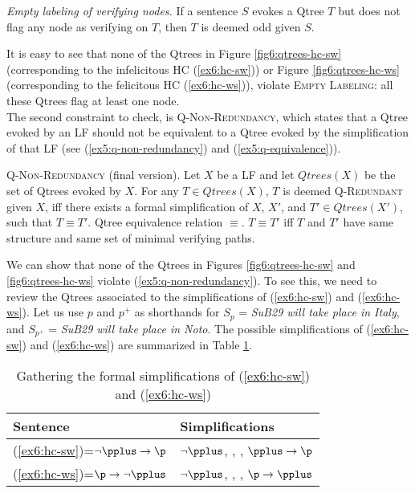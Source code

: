 \begin{exe}
	 {\textit{Empty labeling of verifying nodes.} If a sentence $S$ evokes a Qtree $T$ but does not flag any node as verifying on $T$, then $T$ is deemed odd given $S$.}
\end{exe}

It is easy to see that none of the Qtrees in Figure \ref{fig6:qtrees-hc-sw} (corresponding to the infelicitous HC (\ref{ex6:hc-sw})) or Figure \ref{fig6:qtrees-hc-ws} (corresponding to the felicitous HC (\ref{ex6:hc-ws})), violate \textsc{Empty Labeling}: all these Qtrees flag at least one node.\\


The second constraint to check, is \textsc{Q-Non-Redundancy}, which states that a Qtree evoked by an LF should not be equivalent to a Qtree evoked by the simplification of that LF (see (\ref{ex5:q-non-redundancy}) and (\ref{ex5:q-equivalence})).
\begin{exe}
	 {{\textsc{Q-Non-Redundancy} (final version)}. Let $X$ be a LF and let $Qtrees(X)$ be the set of Qtrees evoked by $X$. For any $T \in Qtrees(X)$, $T$ is deemed \textsc{Q-Redundant} given $X$, iff there exists a formal simplification of $X$, $X'$, and $T' \in Qtrees(X')$, such that $T\equiv T'$.}
	 {Qtree equivalence relation $\equiv$. $T \equiv T'$ iff $T$ and $T'$ have same structure and same set of minimal verifying paths.}
\end{exe}


We can show that none of the Qtrees in Figures \ref{fig6:qtrees-hc-sw} and \ref{fig6:qtrees-hc-ws} violate (\ref{ex5:q-non-redundancy}). To see this, we need to review the Qtrees associated to the simplifications of (\ref{ex6:hc-sw}) and (\ref{ex6:hc-ws}). Let us use $p$ and $p^+$ as shorthands for $S_p$ = \textit{SuB29 will take place in Italy}, and $S_{p^+}$ = \textit{SuB29 will take place in Noto}. The possible simplifications of (\ref{ex6:hc-sw}) and (\ref{ex6:hc-ws}) are summarized in Table \ref{tab6:hc-simplifications}.

\begin{table}[H]
	\centering
	\begin{tabular}{ll}
		\toprule
		Sentence & Simplifications                                             \\ \midrule
		(\ref{ex6:hc-sw})=$\neg\pplus\rightarrow\p$     & $\neg\pplus$, \pplus, \p, $\pplus\rightarrow\p$\\
		(\ref{ex6:hc-ws})=$\p\rightarrow\neg\pplus$     & $\neg\pplus$, \pplus, \p, $\p\rightarrow\pplus$\\\bottomrule            
	\end{tabular}
	\caption[]{Gathering the formal simplifications of (\ref{ex6:hc-sw}) and (\ref{ex6:hc-ws})}\label{tab6:hc-simplifications}
\end{table}



